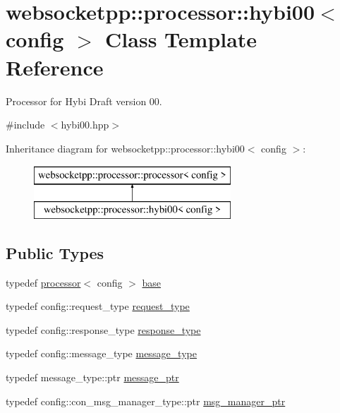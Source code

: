 \hypertarget{classwebsocketpp_1_1processor_1_1hybi00}{}\section{websocketpp\+:\+:processor\+:\+:hybi00$<$ config $>$ Class Template Reference}
\label{classwebsocketpp_1_1processor_1_1hybi00}


Processor for Hybi Draft version 00.  




{\ttfamily \#include $<$hybi00.\+hpp$>$}

Inheritance diagram for websocketpp\+:\+:processor\+:\+:hybi00$<$ config $>$\+:\begin{figure}[H]
\begin{center}
\leavevmode
\includegraphics[height=2.000000cm]{classwebsocketpp_1_1processor_1_1hybi00}
\end{center}
\end{figure}
\subsection*{Public Types}
\begin{DoxyCompactItemize}
\item 
typedef \hyperlink{classwebsocketpp_1_1processor_1_1processor}{processor}$<$ config $>$ \hyperlink{classwebsocketpp_1_1processor_1_1hybi00_ae8842975f6937e834d7df16ecf5b756f}{base}
\item 
typedef config\+::request\+\_\+type \hyperlink{classwebsocketpp_1_1processor_1_1hybi00_a9992ac4efa9cc4d46ee0e9e1060cf860}{request\+\_\+type}
\item 
typedef config\+::response\+\_\+type \hyperlink{classwebsocketpp_1_1processor_1_1hybi00_abef7fc8290a6d30e086c639d5e0b393d}{response\+\_\+type}
\item 
typedef config\+::message\+\_\+type \hyperlink{classwebsocketpp_1_1processor_1_1hybi00_a68b8a926b9fc5fcd296cb698920280ab}{message\+\_\+type}
\item 
typedef message\+\_\+type\+::ptr \hyperlink{classwebsocketpp_1_1processor_1_1hybi00_a300a0810d09570108e3dd747d97a8257}{message\+\_\+ptr}
\item 
typedef config\+::con\+\_\+msg\+\_\+manager\+\_\+type\+::ptr \hyperlink{classwebsocketpp_1_1processor_1_1hybi00_aa33fb6bfdb3c905f267ba7d0c48b192e}{msg\+\_\+manager\+\_\+ptr}
\end{DoxyCompactItemize}

